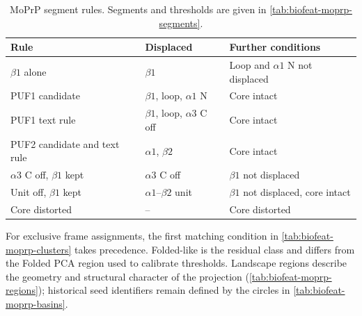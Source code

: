 \begin{table}[htbp]
    \centering
    \small
    \begin{tabularx}{\textwidth}{@{}l>{\raggedright\arraybackslash}X>{\raggedright\arraybackslash}X@{}}
    \toprule
        \textbf{Rule} & \textbf{Displaced} & \textbf{Further conditions} \\
    \midrule
        $\beta1$ alone & $\beta1$ & Loop and $\alpha1$ N not displaced \\
        PUF1 candidate & $\beta1$, loop, $\alpha1$ N & Core intact \\
        PUF1 text rule & $\beta1$, loop, $\alpha3$ C off & Core intact \\
        PUF2 candidate and text rule & $\alpha1$, $\beta2$ & Core intact \\
        $\alpha3$ C off, $\beta1$ kept & $\alpha3$ C off & $\beta1$ not displaced \\
        Unit off, $\beta1$ kept & $\alpha1$--$\beta2$ unit & $\beta1$ not displaced, core intact \\
        Core distorted & -- & Core distorted \\
    \bottomrule
    \end{tabularx}
    \caption{MoPrP segment rules. Segments and thresholds are given in \cref{tab:biofeat-moprp-segments}.}
    \label{tab:biofeat-moprp-rules}
\end{table}

For exclusive frame assignments, the first matching condition in \cref{tab:biofeat-moprp-clusters} takes precedence. Folded-like is the residual class and differs from the Folded PCA region used to calibrate thresholds. Landscape regions describe the geometry and structural character of the projection (\cref{tab:biofeat-moprp-regions}); historical seed identifiers remain defined by the circles in \cref{tab:biofeat-moprp-basins}.

